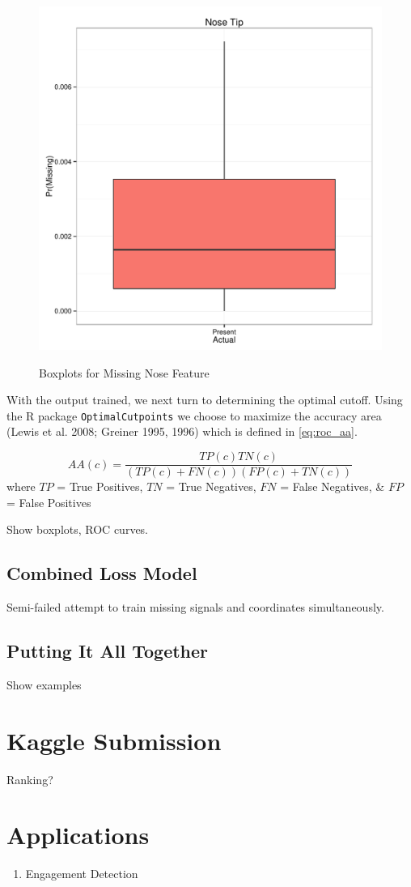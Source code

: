 \documentclass[conference]{IEEEtran}
\begin{document}
\begin{figure}[!ht]
  \centering
  \caption{Boxplots for Missing Nose Feature}
  \includegraphics[scale=.5]{logistic_boxplots_nose.pdf}
  \label{fig:logistic_boxplots_nose}
\end{figure}

With the output trained, we next turn to determining the optimal cutoff.  Using the R package \texttt{OptimalCutpoints} we choose to maximize the accuracy area (Lewis et al. 2008; Greiner 1995, 1996) which is defined in \cref{eq:roc_aa}.

\[\label{eq:roc_aa}
AA(c)=\frac{TP(c)TN(c)}{(TP(c)+FN(c))(FP(c)+TN(c))}
\]
where $TP$ = True Positives, $TN$ = True Negatives, $FN$ = False Negatives, \& $FP$ = False Positives



Show boxplots, ROC curves.
\subsection{Combined Loss Model}
Semi-failed attempt to train missing signals and coordinates simultaneously.
\subsection{Putting It All Together}
Show examples

\section{Kaggle Submission}
Ranking?

\section{Applications}
\begin{enumerate}
\item Engagement Detection
\end{enumerate}
\end{document}
